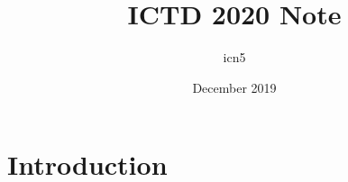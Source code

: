 \documentclass{article}
\title{ICTD 2020 Note}
\author{icn5 }
\date{December 2019}
\begin{document}
\maketitle

\section{Introduction}
\end{document}
